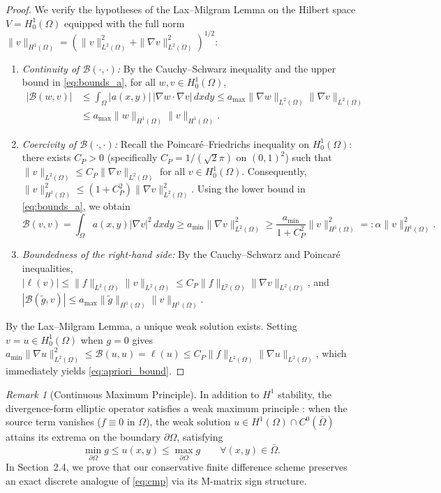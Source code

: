 \documentclass[11pt,a4paper]{article}
\theoremstyle{definition}
\theoremstyle{remark}
\newtheorem{remark}[theorem]{Remark}
\begin{document}
\begin{proof}
We verify the hypotheses of the Lax--Milgram Lemma \cite{quarteroni2017} on the Hilbert space $V = H_0^1(\Omega)$ equipped with the full norm $\|v\|_{H^1(\Omega)} = (\|v\|_{L^2(\Omega)}^2 + \|\nabla v\|_{L^2(\Omega)}^2)^{1/2}$:
\begin{enumerate}[label=(\roman*), leftmargin=2em, itemsep=2pt]
    \item \emph{Continuity of $\mathcal{B}(\cdot,\cdot)$:} By the Cauchy--Schwarz inequality and the upper bound in \eqref{eq:bounds_a}, for all $w, v \in H_0^1(\Omega)$,
    \begin{align*}
        |\mathcal{B}(w,v)|
        &\le \int_\Omega |a(x,y)|\,|\nabla w\cdot\nabla v|\,dxdy
         \le a_{\max}\|\nabla w\|_{L^2(\Omega)}\|\nabla v\|_{L^2(\Omega)} \\
        &\le a_{\max}\|w\|_{H^1(\Omega)}\|v\|_{H^1(\Omega)}.
    \end{align*}
    \item \emph{Coercivity of $\mathcal{B}(\cdot,\cdot)$:} Recall the Poincaré--Friedrichs inequality on $H_0^1(\Omega)$: there exists $C_P > 0$ (specifically $C_P = 1/(\sqrt{2}\pi)$ on $(0,1)^2$) such that $\|v\|_{L^2(\Omega)} \le C_P \|\nabla v\|_{L^2(\Omega)}$ for all $v \in H_0^1(\Omega)$. Consequently, $\|v\|_{H^1(\Omega)}^2 \le (1 + C_P^2)\|\nabla v\|_{L^2(\Omega)}^2$. Using the lower bound in \eqref{eq:bounds_a}, we obtain
    \[
        \mathcal{B}(v,v) = \int_\Omega a(x,y)|\nabla v|^2 \, dxdy \ge a_{\min} \|\nabla v\|_{L^2(\Omega)}^2 \ge \frac{a_{\min}}{1 + C_P^2} \|v\|_{H^1(\Omega)}^2 =: \alpha \|v\|_{H^1(\Omega)}^2.
    \]
    \item \emph{Boundedness of the right-hand side:} By the Cauchy--Schwarz and Poincaré inequalities, $|\ell(v)| \le \|f\|_{L^2(\Omega)} \|v\|_{L^2(\Omega)} \le C_P \|f\|_{L^2(\Omega)} \|\nabla v\|_{L^2(\Omega)}$, and $|\mathcal{B}(\tilde{g}, v)| \le a_{\max} \|\tilde{g}\|_{H^1(\Omega)} \|v\|_{H^1(\Omega)}$.
\end{enumerate}
By the Lax--Milgram Lemma, a unique weak solution exists. Setting $v = u \in H_0^1(\Omega)$ when $g = 0$ gives $a_{\min}\|\nabla u\|_{L^2(\Omega)}^2 \le \mathcal{B}(u,u) = \ell(u) \le C_P \|f\|_{L^2(\Omega)} \|\nabla u\|_{L^2(\Omega)}$, which immediately yields \eqref{eq:apriori_bound}.
\end{proof}

\begin{remark}[Continuous Maximum Principle]
\label{rem:cmp}
In addition to $H^1$ stability, the divergence-form elliptic operator satisfies a weak maximum principle \cite{hackbusch2017}: when the source term vanishes ($f \equiv 0$ in $\Omega$), the weak solution $u \in H^1(\Omega) \cap C^0(\bar{\Omega})$ attains its extrema on the boundary $\partial\Omega$, satisfying
\begin{equation}
    \min_{\partial\Omega} g \le u(x,y) \le \max_{\partial\Omega} g \qquad \forall (x,y) \in \bar{\Omega}.
    \label{eq:cmp}
\end{equation}
In Section~2.4, we prove that our conservative finite difference scheme preserves an exact discrete analogue of \eqref{eq:cmp} via its M-matrix sign structure.
\end{remark}
\end{document}
